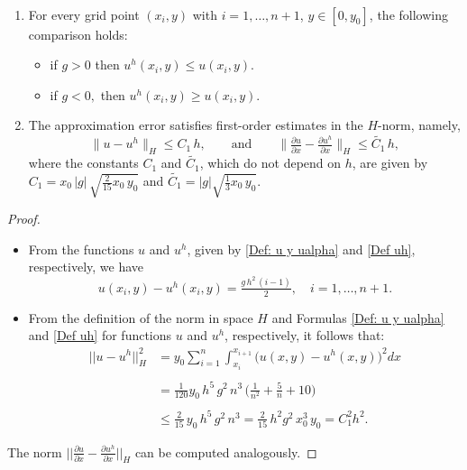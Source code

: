 \documentclass[axioms,article,submit,moreauthors]{Definitions/mdpi}
\newcommand{\dee}{d}
\newcommand{\bint}{\displaystyle\int}
\newcommand\pder[2][]{\ensuremath{\tfrac{\partial#1}{\partial#2}}}
\begin{document}
  \begin{Lemma}\label{Cota u uh} $ $
    \begin{enumerate}   	
\item[(a)]  For every 
 {grid point} $(x_i,y)$ with $i=1,\ldots, n+1$, $y\in[0,y_0]$, {the following comparison holds}: 
    				\begin{itemize}
    						\item [(i)] if $g > 0$  then ${ u^h}(x_i,y) \leq u(x_i,y)$.
 
    						\item [(ii)] if $g < 0,$ then ${ u^h}(x_i,y) \geq u(x_i,y)$.
    				\end{itemize}    
    				
\item[(b)]  {The approximation error satisfies first-order estimates in the $H$-norm, namely,}
    		\[\lVert u-{ u^h} \rVert _H \leq  C_1\,h, \qquad \text{and}\qquad
\lVert \pder[u]{x}-\pder[{u^h}]{x} \rVert _H \leq \widetilde{C_{1}}\, h, \]
    		where {the  constants $C_1$ and $\widetilde{C_1}$, which do not depend on $h$,  are given by }
    		$C_1= x_0\,|g| \,\sqrt{\tfrac{2}{15}x_0\, y_0}$ and $\widetilde{C_{1}}= |g|\sqrt{\tfrac{1}{3}x_0 \, y_0}. $
    \end{enumerate}
    
    \end{Lemma}
\begin{proof} $ $

    \begin{itemize}
     \item[(a)] From the functions $u$ and ${ u^h}$, {given by \eqref{Def: u y ualpha} and \eqref{Def uh}, respectively}, we have 
    			\[ u(x_i, y) - { u^h}(x_i,y)=   \tfrac{g\,h^2 \,(i-1)}{2}, \quad i=1, \ldots , n+1.\] 
      
     \item[(b)] From the definition of the norm in space $H$ and Formulas \eqref{Def: u y ualpha} and \eqref{Def uh} for functions $u$ and ${ u^h}$, respectively, it follows that: 
     \[\begin{array}{ll}
     ||u-{ u^h}||_{H}^2& =y_0 \displaystyle\sum\limits_{i=1}^n \bint_{x_i}^{x_{i+1}}  \big(u(x,y)-{ u^h}(x,y)\big)^2  \dee x\\ 
     \\
    &=\frac{1}{120} y_0 \, h^5\, g^2\, n^3\,\big(\frac{1}{n^2}+\frac{5}{n}+10 \big)\\ 
    \\
        &\leq \frac{2}{15}\,y_0\, h^5\, g^2\, n^3=\frac{2}{15}\, h^2 g^2 \,x_0^3\,y_0=C_1^2 h^2.
     \end{array}\]
    \end{itemize}
The norm  $||\pder[u]{x}-\pder[{u^{h}}]{x}||_{H}$ can be computed analogously.
\end{proof}
\end{document}
